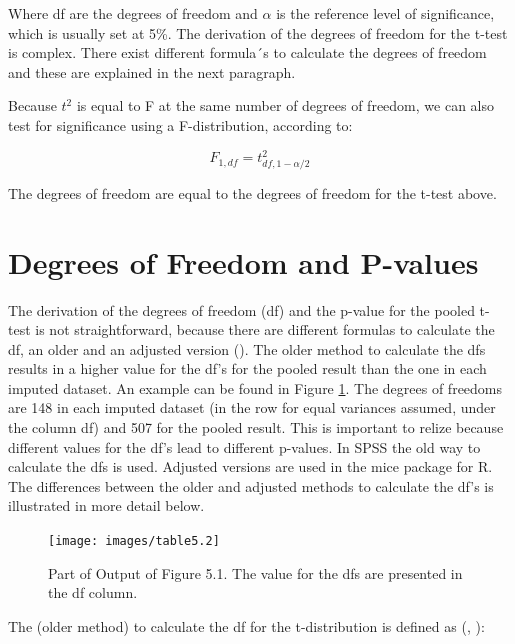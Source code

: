 \documentclass[
]{book}
\begin{document}
Where df are the degrees of freedom and \(\alpha\) is the reference level of significance, which is usually set at 5\%. The derivation of the degrees of freedom for the t-test is complex. There exist different formula´s to calculate the degrees of freedom and these are explained in the next paragraph.

Because \(t^2\) is equal to F at the same number of degrees of freedom, we can also test for significance using a F-distribution, according to:

\begin{equation}
F_{1, df}=t^2_{df,1-\alpha/2}
  \label{eq:f-distr}
\end{equation}

The degrees of freedom are equal to the degrees of freedom for the t-test above.

\hypertarget{degrees-of-freedom-and-p-values}{%
\section{Degrees of Freedom and P-values}\label{degrees-of-freedom-and-p-values}}

The derivation of the degrees of freedom (df) and the p-value for the pooled t-test is not straightforward, because there are different formulas to calculate the df, an older and an adjusted version (\citet{VanBuuren2018}). The older method to calculate the dfs results in a higher value for the df's for the pooled result than the one in each imputed dataset. An example can be found in Figure \ref{fig:tab9-3}. The degrees of freedoms are 148 in each imputed dataset (in the row for equal variances assumed, under the column df) and 507 for the pooled result. This is important to relize because different values for the df's lead to different p-values.
In SPSS the old way to calculate the dfs is used. Adjusted versions are used in the mice package for R. The differences between the older and adjusted methods to calculate the df's is illustrated in more detail below.

\begin{figure}

{\centering \texttt{[image: images/table5.2]} 

}

\caption{Part of Output of Figure 5.1. The value for the dfs are presented in the df column.}\label{fig:tab9-3}
\end{figure}

The (older method) to calculate the df for the t-distribution is defined as (\citet{Rubin1987}, \citet{VanBuuren2018}):
\end{document}
